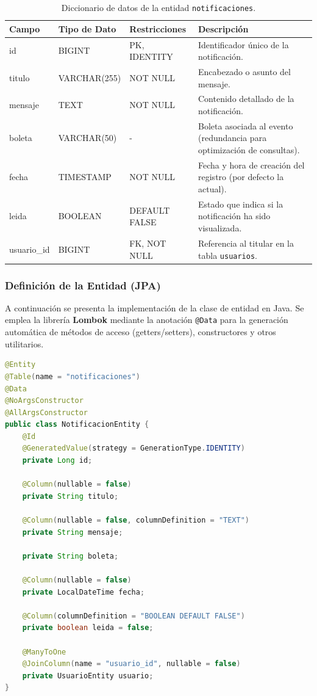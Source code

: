 \begin{table}[H]
\centering
\small
\begin{tabularx}{\textwidth}{|l|l|l|X|}
\hline
\rowcolor{azulESCOM} 
\color{white}\textbf{Campo} & \color{white}\textbf{Tipo de Dato} & \color{white}\textbf{Restricciones} & \color{white}\textbf{Descripci\'on} \\ \hline
id & BIGINT & PK, IDENTITY & Identificador \'unico de la notificaci\'on. \\ \hline
titulo & VARCHAR(255) & NOT NULL & Encabezado o asunto del mensaje. \\ \hline
mensaje & TEXT & NOT NULL & Contenido detallado de la notificaci\'on. \\ \hline
boleta & VARCHAR(50) & - & Boleta asociada al evento (redundancia para optimizaci\'on de consultas). \\ \hline
fecha & TIMESTAMP & NOT NULL & Fecha y hora de creaci\'on del registro (por defecto la actual). \\ \hline
leida & BOOLEAN & DEFAULT FALSE & Estado que indica si la notificaci\'on ha sido visualizada. \\ \hline
usuario\_id & BIGINT & FK, NOT NULL & Referencia al titular en la tabla \texttt{usuarios}. \\ \hline
\end{tabularx}
\caption{Diccionario de datos de la entidad \texttt{notificaciones}.}
\label{tab:dict_notificaciones}
\end{table}

\subsubsection{Definici\'on de la Entidad (JPA)}
A continuaci\'on se presenta la implementaci\'on de la clase de entidad en Java. Se emplea la librer\'ia \textbf{Lombok} mediante la anotaci\'on \texttt{@Data} para la generaci\'on autom\'atica de m\'etodos de acceso (getters/setters), constructores y otros utilitarios.

\begin{lstlisting}[language=Java, caption={Entidad Java para la gesti\'on de notificaciones.}, label={lst:java_notificacion}]
@Entity
@Table(name = "notificaciones")
@Data
@NoArgsConstructor
@AllArgsConstructor
public class NotificacionEntity {
    @Id
    @GeneratedValue(strategy = GenerationType.IDENTITY)
    private Long id;

    @Column(nullable = false)
    private String titulo;
    
    @Column(nullable = false, columnDefinition = "TEXT")
    private String mensaje;
    
    private String boleta;
    
    @Column(nullable = false)
    private LocalDateTime fecha;
    
    @Column(columnDefinition = "BOOLEAN DEFAULT FALSE")
    private boolean leida = false;

    @ManyToOne
    @JoinColumn(name = "usuario_id", nullable = false)
    private UsuarioEntity usuario;
}
\end{lstlisting}


